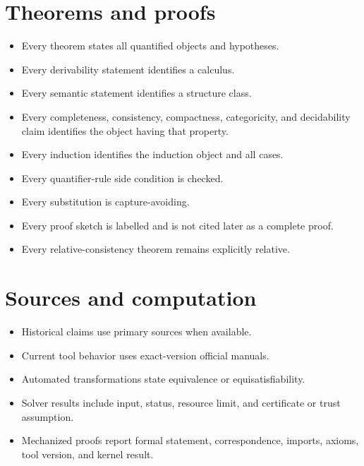 \documentclass[11pt,oneside,openany]{book}
\theoremstyle{definition}
\theoremstyle{plain}
\theoremstyle{remark}
\begin{document}
\section{Theorems and proofs}
\label{sec:release-checklist-02}
\begin{itemize}
  \item Every theorem states all quantified objects and hypotheses.
  \item Every derivability statement identifies a calculus.
  \item Every semantic statement identifies a structure class.
  \item Every completeness, consistency, compactness, categoricity, and
        decidability claim identifies the object having that property.
  \item Every induction identifies the induction object and all cases.
  \item Every quantifier-rule side condition is checked.
  \item Every substitution is capture-avoiding.
  \item Every proof sketch is labelled and is not cited later as a complete
        proof.
  \item Every relative-consistency theorem remains explicitly relative.
\end{itemize}

\section{Sources and computation}
\label{sec:release-checklist-03}
\begin{itemize}
  \item Historical claims use primary sources when available.
  \item Current tool behavior uses exact-version official manuals.
  \item Automated transformations state equivalence or equisatisfiability.
  \item Solver results include input, status, resource limit, and certificate or
        trust assumption.
  \item Mechanized proofs report formal statement, correspondence, imports,
        axioms, tool version, and kernel result.
\end{itemize}
\end{document}
